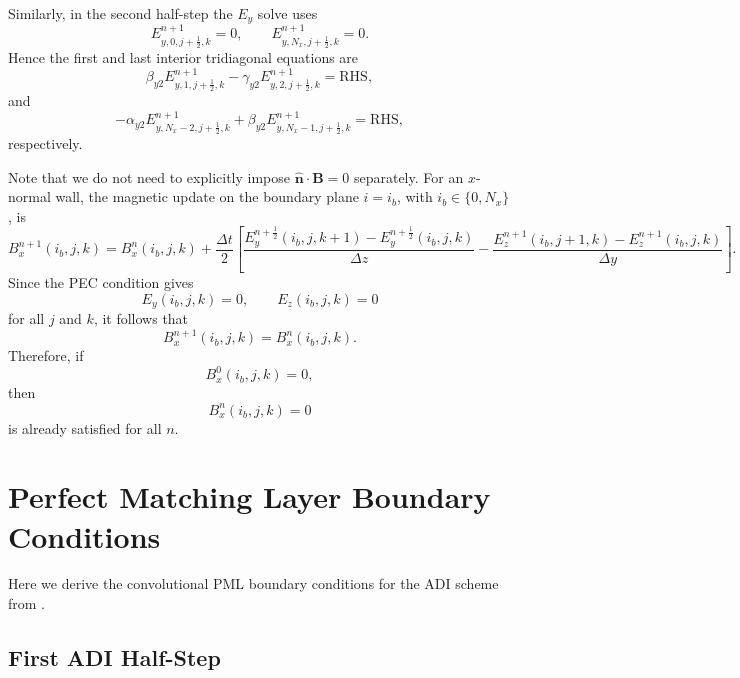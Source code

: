 \documentclass{article}
\numberwithin{equation}{section}
\numberwithin{figure}{section}
\begin{document}
Similarly, in the second half-step the $E_y$ solve uses
\begin{equation}
    E_{y,0,j+\tfrac12,k}^{n+1} = 0, \qquad E_{y,N_x,j+\tfrac12,k}^{n+1} = 0.
\end{equation}
Hence the first and last interior tridiagonal equations are
\begin{equation}
    \beta_{y2} E_{y,1,j+\tfrac12,k}^{n+1} - \gamma_{y2} E_{y,2,j+\tfrac12,k}^{n+1} = \mathrm{RHS},
\end{equation}
and
\begin{equation}
    -\alpha_{y2} E_{y,N_x-2,j+\tfrac12,k}^{n+1} + \beta_{y2} E_{y,N_x-1,j+\tfrac12,k}^{n+1} = \mathrm{RHS},
\end{equation}
respectively.

Note that we do not need to explicitly impose $\hat{\mathbf{n}} \cdot \mathbf{B} = 0$ separately. For an $x$-normal wall, the magnetic update on the boundary plane $i=i_b$, with $i_b \in \{0,N_x\}$, is
\begin{equation}
    B_x^{n+1}(i_b,j,k)
    = B_x^n(i_b,j,k)
    + \frac{\Delta t}{2}\left[
    \frac{E_y^{n+\frac12}(i_b,j,k+1)-E_y^{n+\frac12}(i_b,j,k)}{\Delta z}
    - \frac{E_z^{n+1}(i_b,j+1,k)-E_z^{n+1}(i_b,j,k)}{\Delta y}
    \right].
\end{equation}
Since the PEC condition gives
\begin{equation}
    E_y(i_b,j,k) = 0, \qquad E_z(i_b,j,k) = 0
\end{equation}
for all $j$ and $k$, it follows that
\begin{equation}
    B_x^{n+1}(i_b,j,k) = B_x^n(i_b,j,k).
\end{equation}
Therefore, if
\begin{equation}
    B_x^0(i_b,j,k) = 0,
\end{equation}
then
\begin{equation}
    B_x^n(i_b,j,k) = 0
\end{equation}
is already satisfied for all $n$.

\section{Perfect Matching Layer Boundary Conditions}
Here we derive the convolutional PML boundary conditions for the ADI scheme from \cite{gedney2001perfectly}.

\subsection{First ADI Half-Step}
\end{document}

